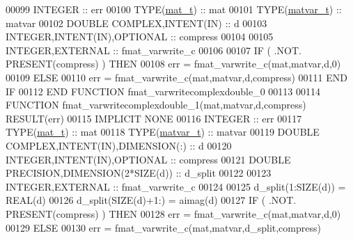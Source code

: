 \begin{DoxyCode}
00099     \textcolor{keywordtype}{INTEGER}                                  :: err
00100     \textcolor{keywordtype}{TYPE}(\hyperlink{group___m_a_t_gab0fc888f5a5d79943b16284b1f91c2e8}{mat\_t})                              :: mat
00101     \textcolor{keywordtype}{TYPE}(\hyperlink{group___m_a_t_structmatvar__t}{matvar\_t})                           :: matvar
00102     \textcolor{keywordtype}{DOUBLE COMPLEX},\textcolor{keywordtype}{INTENT(IN)}                :: d
00103     \textcolor{keywordtype}{INTEGER},\textcolor{keywordtype}{INTENT(IN)},\textcolor{keywordtype}{OPTIONAL}              :: compress
00104 
00105     \textcolor{keywordtype}{INTEGER},\textcolor{keywordtype}{EXTERNAL}                         :: fmat\_varwrite\_c
00106 
00107     \textcolor{keywordflow}{IF} ( .NOT. \textcolor{keyword}{PRESENT}(compress) ) \textcolor{keywordflow}{THEN}
00108         err = fmat\_varwrite\_c(mat,matvar,d,0)
00109     \textcolor{keywordflow}{ELSE}
00110         err = fmat\_varwrite\_c(mat,matvar,d,compress)
00111 \textcolor{keywordflow}{    END IF}
00112 \textcolor{keyword}{END FUNCTION }fmat\_varwritecomplexdouble\_0
00113 
00114 \textcolor{keyword}{FUNCTION }fmat\_varwritecomplexdouble\_1(mat,matvar,d,compress) \textcolor{keyword}{RESULT}(err)
00115 \textcolor{keywordtype}{IMPLICIT NONE}
00116     \textcolor{keywordtype}{INTEGER}                                  :: err
00117     \textcolor{keywordtype}{TYPE}(\hyperlink{group___m_a_t_gab0fc888f5a5d79943b16284b1f91c2e8}{mat\_t})                              :: mat
00118     \textcolor{keywordtype}{TYPE}(\hyperlink{group___m_a_t_structmatvar__t}{matvar\_t})                           :: matvar
00119     \textcolor{keywordtype}{DOUBLE COMPLEX},\textcolor{keywordtype}{INTENT(IN)},\textcolor{keywordtype}{DIMENSION(:)}   :: d
00120     \textcolor{keywordtype}{INTEGER},\textcolor{keywordtype}{INTENT(IN)},\textcolor{keywordtype}{OPTIONAL}              :: compress
00121     \textcolor{keywordtype}{DOUBLE PRECISION},\textcolor{keywordtype}{DIMENSION(2*SIZE(d))}      :: d\_split
00122 
00123     \textcolor{keywordtype}{INTEGER},\textcolor{keywordtype}{EXTERNAL}                         :: fmat\_varwrite\_c
00124 
00125     d\_split(1:\textcolor{keyword}{SIZE}(d))  = \textcolor{keywordtype}{REAL}(d)
00126     d\_split(\textcolor{keyword}{SIZE}(d)+1:) = aimag(d)
00127     \textcolor{keywordflow}{IF} ( .NOT. \textcolor{keyword}{PRESENT}(compress) ) \textcolor{keywordflow}{THEN}
00128         err = fmat\_varwrite\_c(mat,matvar,d,0)
00129     \textcolor{keywordflow}{ELSE}
00130         err = fmat\_varwrite\_c(mat,matvar,d\_split,compress)

\end{DoxyCode}
